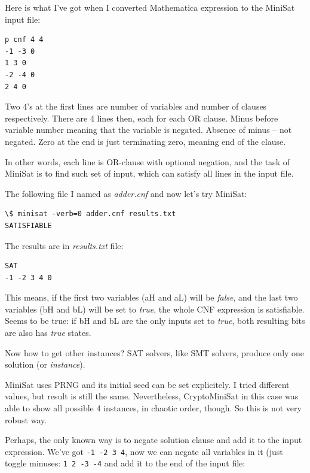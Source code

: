 Here is what I've got when I converted Mathematica expression to the MiniSat input file:

\begin{lstlisting}
p cnf 4 4
-1 -3 0
1 3 0
-2 -4 0
2 4 0
\end{lstlisting}

Two 4's at the first lines are number of variables and number of clauses respectively.
There are 4 lines then, each for each OR clause.
Minus before variable number meaning that the variable is negated.
Absence of minus -- not negated.
Zero at the end is just terminating zero, meaning end of the clause.

In other words, each line is OR-clause with optional negation, and the task of MiniSat is to find such set of input, which can satisfy all lines
in the input file.

The following file I named as \textit{adder.cnf} and now let's try MiniSat:

\begin{lstlisting}
\$ minisat -verb=0 adder.cnf results.txt
SATISFIABLE
\end{lstlisting}

The results are in \textit{results.txt} file:

\begin{lstlisting}
SAT
-1 -2 3 4 0
\end{lstlisting}

This means, if the first two variables (aH and aL) will be \textit{false}, and the last two variables (bH and bL) will be set to \textit{true},
the whole CNF expression is satisfiable.
Seems to be true: if bH and bL are the only inputs set to \textit{true}, both resulting bits are also has \textit{true} states.

Now how to get other instances? SAT solvers, like SMT solvers, produce only one solution (or \textit{instance}).

MiniSat uses PRNG and its initial seed can be set explicitely. I tried different values, but result is still the same.
Nevertheless, CryptoMiniSat in this case was able to show all possible 4 instances, in chaotic order, though.
So this is not very robust way.

Perhaps, the only known way is to negate solution clause and add it to the input expression.
We've got \colorbox{light-gray}{\texttt{-1 -2 3 4}}, 
now we can negate all variables in it (just toggle minuses: \colorbox{light-gray}{\texttt{1 2 -3 -4}} and add it to the end of the input file:


